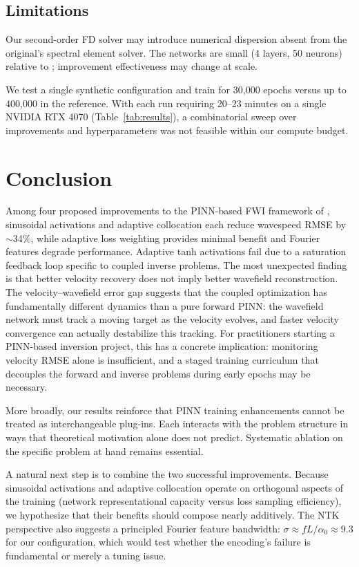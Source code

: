 \documentclass[11pt, letterpaper]{article}
\begin{document}
\subsection{Limitations}
\label{sec:limitations}

Our second-order FD solver may introduce numerical dispersion absent from the original's spectral element solver.
The networks are small (4 layers, 50 neurons) relative to \citet{rashtbehesht2022}; improvement effectiveness may change at scale.

We test a single synthetic configuration and train for 30{,}000 epochs versus up to 400{,}000 in the reference.
With each run requiring 20--23 minutes on a single NVIDIA RTX 4070 (Table~\ref{tab:results}), a combinatorial sweep over improvements and hyperparameters was not feasible within our compute budget.

\section{Conclusion}
\label{sec:conclusion}

Among four proposed improvements to the PINN-based FWI framework of \citet{rashtbehesht2022}, sinusoidal activations and adaptive collocation each reduce wavespeed RMSE by $\sim$34\%, while adaptive loss weighting provides minimal benefit and Fourier features degrade performance.
Adaptive tanh activations fail due to a saturation feedback loop specific to coupled inverse problems.
The most unexpected finding is that better velocity recovery does not imply better wavefield reconstruction.
The velocity--wavefield error gap suggests that the coupled optimization has fundamentally different dynamics than a pure forward PINN: the wavefield network must track a moving target as the velocity evolves, and faster velocity convergence can actually destabilize this tracking.
For practitioners starting a PINN-based inversion project, this has a concrete implication: monitoring velocity RMSE alone is insufficient, and a staged training curriculum that decouples the forward and inverse problems during early epochs may be necessary.

More broadly, our results reinforce that PINN training enhancements cannot be treated as interchangeable plug-ins.
Each interacts with the problem structure in ways that theoretical motivation alone does not predict.
Systematic ablation on the specific problem at hand remains essential.

A natural next step is to combine the two successful improvements.
Because sinusoidal activations and adaptive collocation operate on orthogonal aspects of the training (network representational capacity versus loss sampling efficiency), we hypothesize that their benefits should compose nearly additively.
The NTK perspective also suggests a principled Fourier feature bandwidth: $\sigma \approx fL/\alpha_0 \approx 9.3$ for our configuration, which would test whether the encoding's failure is fundamental or merely a tuning issue.
\clearpage
\end{document}
